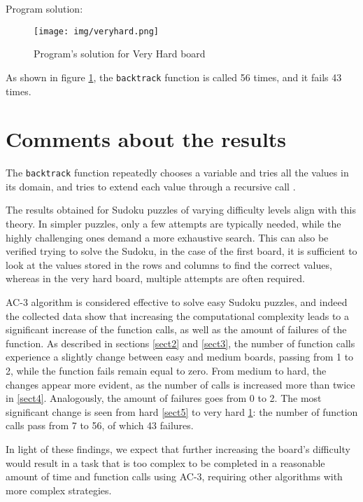 \documentclass{article}
\begin{document}
Program solution:
\begin{figure}[H]
\centering
\texttt{[image: img/veryhard.png]}
\caption{\label{fig:veryhard}Program's solution for Very Hard board}
\end{figure}

As shown in figure \ref{fig:veryhard}, the \texttt{backtrack} function is called 56 times, and it fails 43 times.

\newpage
\section{Comments about the results}\label{sect6}
The \texttt{backtrack} function repeatedly chooses a variable and tries all the values in its domain, and tries to extend each value through a recursive call \cite{ai}. 

The results obtained for Sudoku puzzles of varying difficulty levels align with this theory. In simpler puzzles, only a few attempts are typically needed, while the highly challenging ones demand a more exhaustive search.
This can also be verified trying to solve the Sudoku, in the case of the first board, it is sufficient to look at the values stored in the rows and columns to find the correct values, whereas in the very hard board, multiple attempts are often required.

AC-3 algorithm is considered effective to solve easy Sudoku puzzles, and indeed the collected data show that increasing the computational complexity leads to a significant increase of the function calls, as well as the amount of failures of the function.
As described in sections \ref{sect2} and \ref{sect3}, the number of function calls experience a slightly change between easy and medium boards, passing from 1 to 2, while the function fails remain equal to zero.
From medium to hard, the changes appear more evident, as the number of calls is increased more than twice in \ref{sect4}. Analogously, the amount of failures goes from 0 to 2.
The most significant change is seen from hard \ref{sect5} to very hard \ref{sect6}: the number of function calls pass from 7 to 56, of which 43 failures.

In light of these findings, we expect that further increasing the board's difficulty would result in a task that is too complex to be completed in a reasonable amount of time and function calls using AC-3, requiring other algorithms with more complex strategies.


\textit{}
\end{document}
